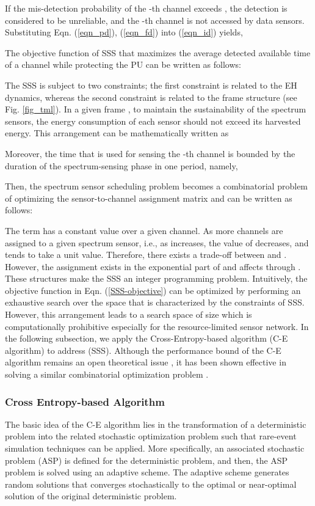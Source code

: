 \documentclass[journal]{IEEEtran} \ifCLASSINFOpdf
\begin{document}
If the mis-detection probability of the -th channel exceeds  , the detection is considered to be unreliable, and the -th channel is not accessed by data sensors. Substituting Eqn. (\ref{eqn_pd}), (\ref{eqn_fd}) into (\ref{eqn_id}) yields,


The objective function of SSS that maximizes the average detected available time of a channel while protecting the PU can be written as follows:

The SSS is subject to two constraints; the first constraint is related to the EH dynamics, whereas the second constraint is related to the frame structure (see Fig. \ref{fig_tml}). In a given frame , to maintain the sustainability of the spectrum sensors, the energy consumption of each sensor should not exceed its harvested energy. This arrangement can be mathematically written as

Moreover, the time that is used for sensing the -th channel is bounded by the duration of the spectrum-sensing phase  in one period, namely,

Then, the spectrum sensor scheduling problem becomes a combinatorial problem of optimizing the sensor-to-channel assignment matrix  and can be written as follows:

The term  has a constant value over a given channel. As more channels are assigned to a given spectrum sensor, i.e., as  increases, the value of  decreases, and  tends to take a unit value. Therefore, there exists a trade-off between  and . However, the assignment  exists in the exponential part of  and affects  through . These structures make the SSS an integer programming problem. Intuitively, the objective function in Eqn. (\ref{SSS-objective}) can be optimized by performing an exhaustive search over the space that is characterized by the constraints of SSS. However, this arrangement leads to a search space of size  which is computationally prohibitive especially for the resource-limited sensor network. In the following subsection, we apply the Cross-Entropy-based algorithm (C-E algorithm) \cite{Rubinstein1999} to address (SSS). Although the performance bound of the C-E algorithm remains an open theoretical issue \cite{DeBoer2005}, it has been shown effective in solving a similar combinatorial optimization problem \cite{Zhang2014}.

\subsubsection{Cross Entropy-based Algorithm}
The basic idea of the C-E algorithm lies in the transformation of a deterministic problem into the related stochastic optimization problem such that rare-event simulation techniques can be applied. More specifically, an associated stochastic problem (ASP) is defined for the deterministic problem, and then, the ASP problem is solved using an adaptive scheme. The adaptive scheme generates random solutions that converges stochastically to the optimal or near-optimal solution of the original deterministic problem.
\end{document}

